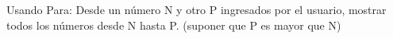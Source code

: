﻿
Usando Para: Desde un número N y otro P ingresados por el usuario, mostrar todos los números desde N hasta P. (suponer que P es mayor que N)



\volverindice
\newpage
